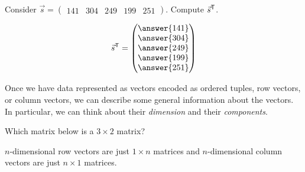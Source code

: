 \documentclass{ximera}
\begin{document}
\begin{exploration}
        \begin{question}
          Consider $\vec{s} = \begin{pmatrix}141 & 304 & 249 & 199 & 251 \end{pmatrix}$. Compute $\vec{s}^{\mathsf{T}}$.
          \begin{prompt}
          \[
          \vec{s}^\transpose  = \begin{pmatrix}\answer{141} \\ \answer{304} \\ \answer{249} \\ \answer{199} \\ \answer{251} \end{pmatrix}
          \]
          \end{prompt}
        \end{question}
        
        Once we have data represented as vectors encoded as ordered tuples,
        row vectors, or column vectors, we can describe some general
        information about the vectors. In particular, we can think about their
        \textit{dimension} and their \textit{components}.

        \begin{question}
          Which matrix below is a $3\times 2$ matrix?
          \begin{multipleChoice}
        
            
            
        \end{multipleChoice}
        \end{question}
        
        $n$-dimensional row vectors are just $1\times n$ matrices and
        $n$-dimensional column vectors are just $n\times 1$ matrices.

\end{exploration}
\end{document}
